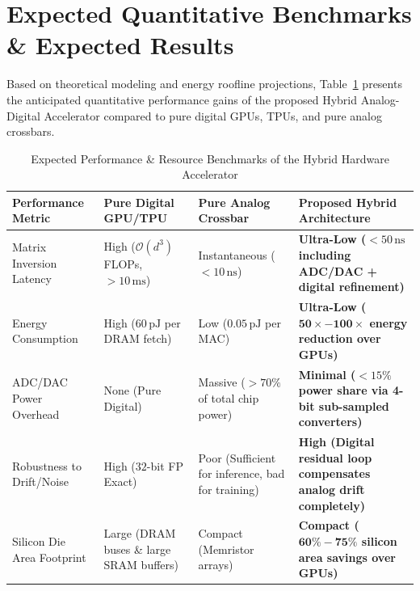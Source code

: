 \section{Expected Quantitative Benchmarks \& Expected Results}
Based on theoretical modeling and energy roofline projections, Table~\ref{tab:ch13_expected_results} presents the anticipated quantitative performance gains of the proposed Hybrid Analog-Digital Accelerator compared to pure digital GPUs, TPUs, and pure analog crossbars.

\begin{table}[htbp]
\centering
\caption{Expected Performance \& Resource Benchmarks of the Hybrid Hardware Accelerator}
\label{tab:ch13_expected_results}
\begin{tabularx}{\textwidth}{>{\raggedright\arraybackslash}p{3.5cm} >{\raggedright\arraybackslash}p{2.6cm} >{\raggedright\arraybackslash}p{2.6cm} >{\raggedright\arraybackslash}X}
\toprule
\textbf{Performance Metric} & \textbf{Pure Digital GPU/TPU} & \textbf{Pure Analog Crossbar} & \textbf{Proposed Hybrid Architecture} \\
\midrule
Matrix Inversion Latency & High ($\mathcal{O}(d^3)$ FLOPs, $>10\,\text{ms}$) & Instantaneous ($<10\,\text{ns}$) & \textbf{Ultra-Low ($<50\,\text{ns}$ including ADC/DAC + digital refinement)} \\
Energy Consumption & High ($60\,\text{pJ}$ per DRAM fetch) & Low ($0.05\,\text{pJ}$ per MAC) & \textbf{Ultra-Low ($\mathbf{50\times - 100\times}$ energy reduction over GPUs)} \\
ADC/DAC Power Overhead & None (Pure Digital) & Massive ($>70\%$ of total chip power) & \textbf{Minimal ($<15\%$ power share via 4-bit sub-sampled converters)} \\
Robustness to Drift/Noise & High ($32$-bit FP Exact) & Poor (Sufficient for inference, bad for training) & \textbf{High (Digital residual loop compensates analog drift completely)} \\
Silicon Die Area Footprint & Large (DRAM buses \& large SRAM buffers) & Compact (Memristor arrays) & \textbf{Compact ($\mathbf{60\% - 75\%}$ silicon area savings over GPUs)} \\
\bottomrule
\end{tabularx}
\end{table}

